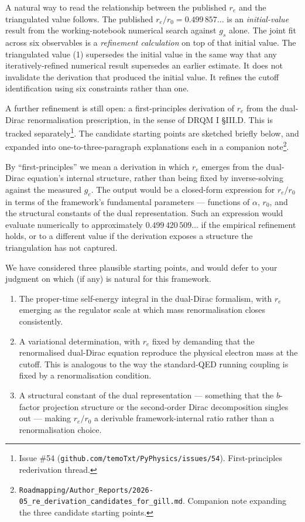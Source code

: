 \documentclass[
  11pt,
]{article}
\providecommand{\tightlist}{%
  \setlength{\itemsep}{0pt}\setlength{\parskip}{0pt}}
\begin{document}
A natural way to read the relationship between the published \(r_e\) and
the triangulated value follows. The published
\(r_e/r_0 = 0.499\,857\ldots\) is an \emph{initial-value} result from
the working-notebook numerical search against \(g_s\) alone. The joint
fit across six observables is a \emph{refinement calculation} on top of
that initial value. The triangulated value (1) supersedes the initial
value in the same way that any iteratively-refined numerical result
supersedes an earlier estimate. It does not invalidate the derivation
that produced the initial value. It refines the cutoff identification
using six constraints rather than one.

A further refinement is still open: a first-principles derivation of
\(r_e\) from the dual-Dirac renormalisation prescription, in the sense
of DRQM I §III.D. This is tracked separately\footnote{Issue \#54
  (\texttt{github.com/temoTxt/PyPhysics/issues/54}). First-principles
  rederivation thread.}. The candidate starting points are sketched
briefly below, and expanded into one-to-three-paragraph explanations
each in a companion note\footnote{\texttt{Roadmapping/Author\_Reports/2026-05\_re\_derivation\_candidates\_for\_gill.md}.
  Companion note expanding the three candidate starting points.}.

By ``first-principles'' we mean a derivation in which \(r_e\) emerges
from the dual-Dirac equation's internal structure, rather than being
fixed by inverse-solving against the measured \(g_e\). The output would
be a closed-form expression for \(r_e/r_0\) in terms of the framework's
fundamental parameters --- functions of \(\alpha\), \(r_0\), and the
structural constants of the dual representation. Such an expression
would evaluate numerically to approximately \(0.499\,420\,509\ldots\) if
the empirical refinement holds, or to a different value if the
derivation exposes a structure the triangulation has not captured.

We have considered three plausible starting points, and would defer to
your judgment on which (if any) is natural for this framework.

\begin{enumerate}
\def\labelenumi{\arabic{enumi}.}
\tightlist
\item
  The proper-time self-energy integral in the dual-Dirac formalism, with
  \(r_e\) emerging as the regulator scale at which mass renormalisation
  closes consistently.
\item
  A variational determination, with \(r_e\) fixed by demanding that the
  renormalised dual-Dirac equation reproduce the physical electron mass
  at the cutoff. This is analogous to the way the standard-QED running
  coupling is fixed by a renormalisation condition.
\item
  A structural constant of the dual representation --- something that
  the \(b\)-factor projection structure or the second-order Dirac
  decomposition singles out --- making \(r_e/r_0\) a derivable
  framework-internal ratio rather than a renormalisation choice.
\end{enumerate}
\end{document}
